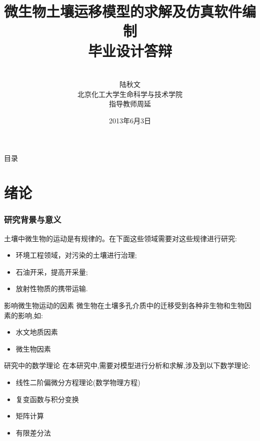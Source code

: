 \documentclass[xcolor=svgnames]{beamer} %
\title[微生物土壤运移模型的求解及仿真软件编制]{微生物土壤运移模型的求解及仿真软件编制 \\ \kaishu 毕业设计答辩}
\author[陆秋文]{ \\ 陆秋文 \\ 北京化工大学生命科学与技术学院 \\[1.5em] \kaishu 指导教师\quad 周\quad 延 } %
\date{2013年6月3日}
\newenvironment{fsitemize}{\begin{itemize}\fangsong}{\end{itemize}}   %
\begin{document}
\begin{frame}
\maketitle
\end{frame}
\begin{frame}{目录}
\tableofcontents
\end{frame}
\section{绪论}
	\begin{frame}
	\frametitle{研究背景与意义}
	土壤中微生物的运动是有规律的。在下面这些领域需要对这些规律进行研究:
	\begin{fsitemize}
	\item 环境工程领域，对污染的土壤进行治理;
	\item 石油开采，提高开采量;
	\item 放射性物质的携带运输.
	\end{fsitemize}
	\end{frame}
	\begin{frame}{影响微生物运动的因素}
	微生物在土壤多孔介质中的迁移受到各种非生物和生物因素的影响,如:
	\begin{fsitemize}
	 \item 水文地质因素
	 \item 微生物因素	 
	\end{fsitemize}
	\end{frame}
	\begin{frame}{研究中的数学理论}
	在本研究中,需要对模型进行分析和求解,涉及到以下数学理论:
	\begin{fsitemize}
	\item 线性二阶偏微分方程理论(数学物理方程)
	\item 复变函数与积分变换
	\item 矩阵计算
	\item 有限差分法
	\end{fsitemize}
	\end{frame}
\end{document}
